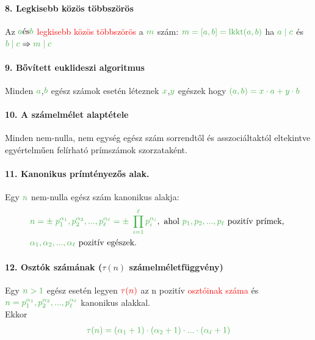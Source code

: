 \documentclass[10pt,a4paper]{article}
\renewcommand{\>}{\rightarrow}
\renewcommand{\r}{\tau}
\newcommand{\mmod}[2]{#1  \mid #2}
\renewcommand{\a}{\gr{a}}
\renewcommand{\b}{\gr{b}}
\newcommand{\x}{\gr{x}}
\newcommand{\y}{\gr{y}}
\newcommand{\red}[1]{\textcolor{red}{#1}}
\newcommand{\gr}[1]{\textcolor{FancsaliGreen}{#1}}
\newenvironment{m}
    {\begin{center}
    \begin{mdframed}[backgroundcolor=FancsaliBlue]
    }
    { 
    \end{mdframed}
    \end{center}
    }
\begin{document}
\paragraph{8. Legkisebb közös többszörös}
\begin{m}
Az $\gr{a} \text{és} \gr{b}$ \red{legkisebb közös többszörös} a $\gr{m}$ szám: $\gr{m=[a,b] = \text{lkkt}(a,b)}$ ha $\gr{\mmod{a}{c}}$ és $\gr{\mmod{b}{c}} \Rightarrow \gr{\mmod{m}{c}}$
\end{m}
\paragraph{9. Bővített euklideszi algoritmus}
\begin{m}
Minden $\a$,$\b$ egész számok esetén léteznek $\x$,$\y$ egészek hogy $\gr{(a,b)=x\cdot a + y \cdot b}$ 
\end{m}
\paragraph{10. A számelmélet alaptétele}
\begin{m}
Minden nem-nulla, nem egység egész szám sorrendtől és asszociáltaktól eltekintve egyértelműen felírható prímszámok szorzataként.
\end{m}
\paragraph{11. Kanonikus prímtényezős alak.}
\begin{m}
Egy $\gr{n}$ nem-nulla egész szám kanonikus alakja:
\begin{align*}
& \gr{n = \pm \; p_1^{\alpha_1}, p_2^{\alpha_2}, ... , p_\ell^{\alpha_\ell} = \pm \; \prod\limits_{i=1}^\ell p_i^{\alpha_i}}, \text{ ahol } \gr{p_1,p_2,...,p_\ell} \text{ pozitív prímek, } \\ & \gr{\alpha_1,\alpha_2,...,\alpha_\ell} \text{ pozitív egészek.}
\end{align*}
\end{m}
\paragraph{12. Osztók számának ($\r(n)$ számelméletfüggvény)}
\begin{m}
Egy $\gr{n > 1}$ egész esetén legyen $\red{\r(n)}$ az n pozitív \red{osztóinak száma} és \\ $\gr{n = p_1^{\alpha_1},p_2^{\alpha_2},...,p_\ell^{\alpha_\ell}}$ kanonikus alakkal. \\ 
Ekkor
\begin{align*}
\gr{\r(n)=(\alpha_1 + 1)\cdot (\alpha_2 + 1) \cdot ... \cdot (\alpha_\ell +1)}
\end{align*}
\end{m}
\newpage
\end{document}
